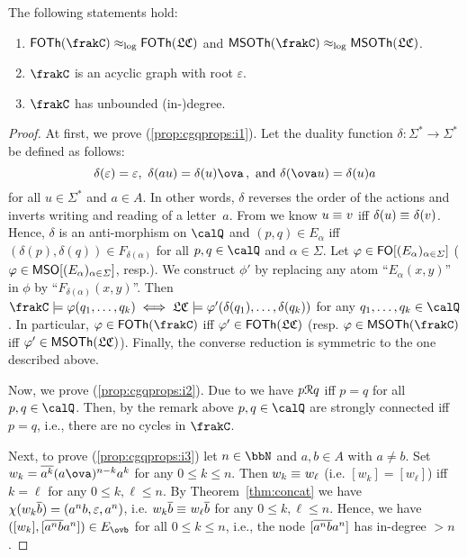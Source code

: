 \begin{proposition}\label{prop:cgqprops}
	The following statements hold:
	\begin{enumerate}[(1)]
		\item $\FOTh{\cQ}\eqlog\FOTh{\lcQ}$ and $\MSOTh{\cQ}\eqlog\MSOTh{\lcQ}$.\label{prop:cgqprops:i1}
		\item $\cQ$ is an acyclic graph with root $\varepsilon$.\label{prop:cgqprops:i2}
		\item $\cQ$ has unbounded (in-)degree.\label{prop:cgqprops:i3}
	\end{enumerate}
\end{proposition}
\begin{proof}
	At first, we prove (\ref{prop:cgqprops:i1}). Let the duality function $\delta\colon\varSigma^*\to\varSigma^*$ be defined as follows:
	\[\delta(\varepsilon)=\varepsilon,\ \delta(au)=\delta(u)\ova\,,\text{ and }\delta(\ova u)=\delta(u)a\]
	for all $u\in\varSigma^*$ and $a\in A$. In other words, $\delta$ reverses the order of the actions and inverts writing and reading of a letter~$a$. From \cite[Proposition~3.4]{HusKZ17} we know $u\equiv_{} v$ iff $\delta(u)\equiv_{}\delta(v)$. Hence, $\delta$ is an anti-morphism on $\Qx$ and $(p,q)\in E_\alpha$ iff $(\delta(p),\delta(q))\in F_{\delta(\alpha)}$ for all $p,q\in\Qx$ and $\alpha\in\varSigma$. Let $\varphi\in\mathsf{FO}[(E_\alpha)_{\alpha\in\varSigma}]$ ($\varphi\in\mathsf{MSO}[(E_\alpha)_{\alpha\in\varSigma}]$, resp.). We construct $\phi'$ by replacing any atom ``$E_\alpha(x,y)$'' in $\phi$ by ``$F_{\delta(\alpha)}(x,y)$''. Then
	$\cQ\models\phi(q_1,\dots,q_k) \iff \lcQ\models\phi'(\delta(q_1),\dots,\delta(q_k))$ for any $q_1,\dots,q_k\in\Qx$. In particular, $\phi\in\FOTh{\cQ}$ iff $\varphi'\in\mathsf{FOTh}(\mathfrak{LC})$ (resp. $\phi\in\MSOTh{\cQ}$ iff $\varphi'\in\mathsf{MSOTh}(\mathfrak{LC})$). Finally, the converse reduction is symmetric to the one described above.
	
	Now, we prove (\ref{prop:cgqprops:i2}). Due to \cite[Corollary~4.7]{HusKZ17} we have $p\mathcal{R} q$ iff $p=q$ for all $p,q\in\Qx$. Then, by the remark above $p,q\in\Qx$ are strongly connected iff $p=q$, i.e., there are no cycles in $\cQ$.
	
	Next, to prove (\ref{prop:cgqprops:i3}) let $n\in\bbN$ and $a,b\in A$ with $a\neq b$. Set $w_k=\ov{a^k}(a\ova)^{n-k}a^k$ for any $0\leq k\leq n$. Then $w_k\equiv_{} w_\ell$ (i.e. $[w_k]=[w_\ell]$) iff $k=\ell$ for any $0\leq k,\ell\leq n$. By Theorem~\ref{thm:concat} we have $\chi(w_k\overline{b})=(a^nb,\varepsilon,a^n)$, i.e. $w_k\overline{b}\equiv_{} w_\ell\overline{b}$ for any $0\leq k,\ell\leq n$. Hence, we have $([w_k],[\ov{a^nb}a^n])\in E_{\ovb}$ for all $0\leq k\leq n$, i.e., the node $[\overline{a^nb}a^n]$ has in-degree $>n$.
\end{proof}

